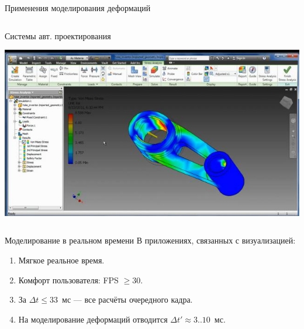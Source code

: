 \documentclass[usenames,dvipsnames,pdftex,unicode,hidelinks]{beamer}
\renewcommand{\le}{\leqslant} %
\renewcommand{\ge}{\geqslant} %
\begin{document}
\begin{frame}{Применения моделирования деформаций}
\begin{columns}[c]
\begin{column}{0.5\textwidth}
\begin{center}
          Системы авт. проектирования

          \includegraphics[height=0.3\textheight]{cad}
        \end{center}
      \end{column}
    \end{columns}
  \end{frame}
  \begin{frame}{Моделирование в реальном времени}
    В приложениях, связанных с визуализацией:
    \begin{enumerate}
      \item \alert{Мягкое} реальное время.
      \item Комфорт пользователя: FPS $\ge 30$.
      \item За $\Delta t \le 33$~мс --- \alert{все} расчёты очередного кадра.
      \item На моделирование деформаций отводится \alert{$\Delta t' \approx 3..10$~мс}.
    \end{enumerate}

    \vspace{5mm}

    \begin{center}
    \end{center}
  \end{frame}
\end{document}

